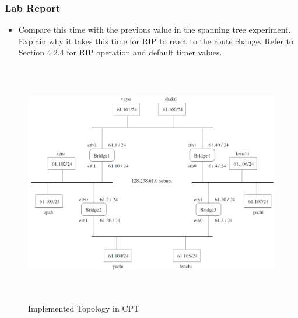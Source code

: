 \documentclass[10pt,a4paper]{article}
\numberwithin{equation}{section}
\numberwithin{figure}{section}
\numberwithin{table}{section}
\begin{document}
\subsubsection*{ Lab Report}
\begin{itemize}
	\setlength{\itemindent}{0pt}
	\item Compare this time with the previous value in the spanning tree experiment. Explain why it takes this time for RIP to react to the route change. Refer to Section 4.2.4 for RIP operation and default timer values.
\end{itemize}

\begin{figure}[H]
	\centering
    \includegraphics[height=300pt]{img/fig4.png}
    \caption{Implemented Topology in CPT}
    \label{fig:Topo}
\end{figure}
\end{document}
